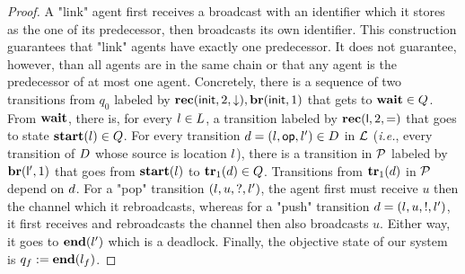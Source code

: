 \begin{proof}
	A "link" agent first receives a broadcast with an identifier which it stores as the one of its predecessor, then broadcasts its own identifier. This construction guarantees that "link" agents have exactly one predecessor. It does not guarantee, however, than all agents are in the same chain or that any agent is the predecessor of at most one agent. Concretely, there is a sequence of two transitions from $q_0$ labeled by $\textbf{rec}(\mathsf{init}, 2, \downarrow), \textbf{br}(\mathsf{init}, 1)$ that gets to $\mathbf{wait} \in Q$. 
	From $\mathbf{wait}$, there is, for every $l \in L$, a transition labeled by $\textbf{rec}(\mathsf{l}, 2, {=})$ that goes to state $\mathbf{start}(l) \in Q$. 
	For every transition $d = (l, \mathsf{op}, l') \in D$ in $\mathcal{L}$ (\emph{i.e.}, every transition of $D$ whose source is location $l$), there is a transition in $\mathcal{P}$ labeled by $\textbf{br}(\mathsf{l'}, 1)$ that goes from $\mathbf{start}(l)$ to $\mathbf{tr}_1(d) \in Q$. 
	Transitions from $\mathbf{tr}_1(d)$ in $\mathcal{P}$ depend on $d$. For a "pop" transition $(l, u, ?, l')$, the agent first must receive $u$ then the channel which it rebroadcasts, whereas for a "push" transition $d= (l, u,!, l')$, it first receives and rebroadcasts the channel then also broadcasts $u$. Either way, it goes to $\mathbf{end}(l')$ which is a deadlock. 
	Finally, the objective state of our system is $q_f := \mathbf{end}(l_f)$.
	

\end{proof}
